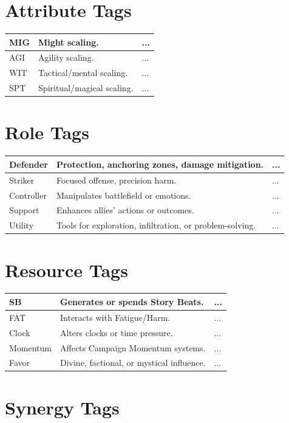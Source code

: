 \documentclass[11pt]{book}
\begin{document}
\section{Attribute Tags}

\begin{longtable}{|p{3cm}|p{6cm}|p{4cm}|}
\hline
MIG & Might scaling. & ... \\ \hline
AGI & Agility scaling. & ... \\ \hline
WIT & Tactical/mental scaling. & ... \\ \hline
SPT & Spiritual/magical scaling. & ... \\ \hline
\end{longtable}

\section{Role Tags}

\begin{longtable}{|p{3cm}|p{6cm}|p{4cm}|}
\hline
Defender & Protection, anchoring zones, damage mitigation. & ... \\ \hline
Striker & Focused offense, precision harm. & ... \\ \hline
Controller & Manipulates battlefield or emotions. & ... \\ \hline
Support & Enhances allies' actions or outcomes. & ... \\ \hline
Utility & Tools for exploration, infiltration, or problem-solving. & ... \\ \hline
\end{longtable}

\section{Resource Tags}

\begin{longtable}{|p{3cm}|p{6cm}|p{4cm}|}
\hline
SB & Generates or spends Story Beats. & ... \\ \hline
FAT & Interacts with Fatigue/Harm. & ... \\ \hline
Clock & Alters clocks or time pressure. & ... \\ \hline
Momentum & Affects Campaign Momentum systems. & ... \\ \hline
Favor & Divine, factional, or mystical influence. & ... \\ \hline
\end{longtable}

\section{Synergy Tags}
\end{document}
